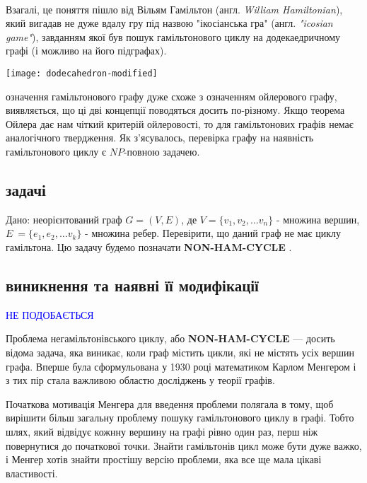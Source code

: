 \documentclass[14pt]{article}
\begin{document}
\begin{spacing}{1.175}
        \\
        \quad Взагалі, це поняття пішло від Вільям Гамільтон (англ. \textit{William Hamiltonian}), який вигадав не дуже вдалу гру під назвою "ікосіанська гра" (англ. \textit{"icosian game"}), завданням якої був пошук гамільтонового циклу на додекаедричному графі (і можливо на його підграфах). \\
        \begin{center}
        \texttt{[image: dodecahedron-modified]} \\
        \end{center}
        
         означення гамільтонового графу дуже схоже з означенням ойлерового графу, виявляється, що ці дві концепції поводяться досить по-різному. Якщо теорема Ойлера дає нам чіткий критерій ойлеровості, то для гамільтонових графів немає аналогічного твердження. Як з'ясувалось, перевірка графу на наявність гамільтонового циклу є \(NP\)-повною задачею.

        \newcommand{\nonhamcycle}{\textbf{NON-HAM-CYCLE }}
        \newcommand{\hamcycle}{\textbf{HAM-CYCLE }}
        \newcommand{\dhampath}{\textbf{D-HAM-PATH }}
        \newcommand{\tsat}{\textbf{3SAT }}

        
        \subsection{ задачі}
        \quad Дано: неорієнтований граф \(G = (V,E)\), де \(V = \{v_1, v_2, \dots v_n\}\) - множина вершин, \(E\ = \{e_1, e_2, \dots v_k\}\) - множина ребер. Перевірити, що даний граф не має циклу гамільтона. Цю задачу будемо позначати \nonhamcycle .    
        \subsection{ виникнення та наявні її модифікації}
        \textcolor{blue}{НЕ ПОДОБАЄТЬСЯ}
        
        Проблема негамільтонівського циклу, або \nonhamcycle — досить відома задача, яка виникає, коли граф містить цикли, які не містять усіх вершин графа. Вперше була сформульована у 1930 році математиком Карлом Менгером і з тих пір стала важливою областю досліджень у теорії графів.

        Початкова мотивація Менгера для введення проблеми полягала в тому, щоб вирішити більш загальну проблему пошуку гамільтонового циклу в графі. Тобто шлях, який відвідує кожнну вершину на графі рівно один раз, перш ніж повернутися до початкової точки. Знайти гамільтонів цикл може бути дуже важко, і Менгер хотів знайти простішу версію проблеми, яка все ще мала цікаві властивості.


\end{spacing}
\end{document}
